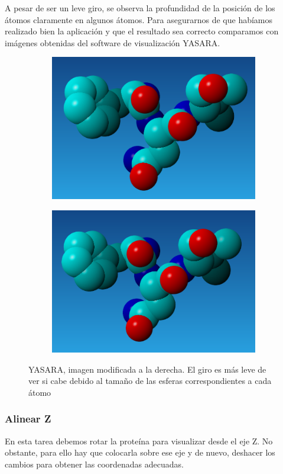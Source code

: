 \documentclass[12pt]{article}
\begin{document}
A pesar de ser un leve giro, se observa la profundidad de la posición de los átomos claramente en algunos átomos. Para asegurarnos de que habíamos realizado bien la aplicación y que el resultado sea correcto comparamos con imágenes obtenidas del software de visualización YASARA.

\begin{figure}[H]
\centering
\begin{subfigure}[b]{0.49\textwidth}
\raggedright
\includegraphics[scale=0.6]{Screenshot_49}
\end{subfigure}
\begin{subfigure}[b]{0.49\textwidth}
\raggedleft
\includegraphics[scale=0.6]{Screenshot_50}
\end{subfigure}
\caption{YASARA, imagen modificada a la derecha. El giro es más leve de ver si cabe debido al tamaño de las esferas correspondientes a cada átomo}
\end{figure}

\subsubsection{Alinear Z}
En esta tarea debemos rotar la proteína para visualizar desde el eje Z. No obstante, para ello hay que colocarla sobre ese eje y de nuevo, deshacer los cambios para obtener las coordenadas adecuadas.
\newline
\end{document}

